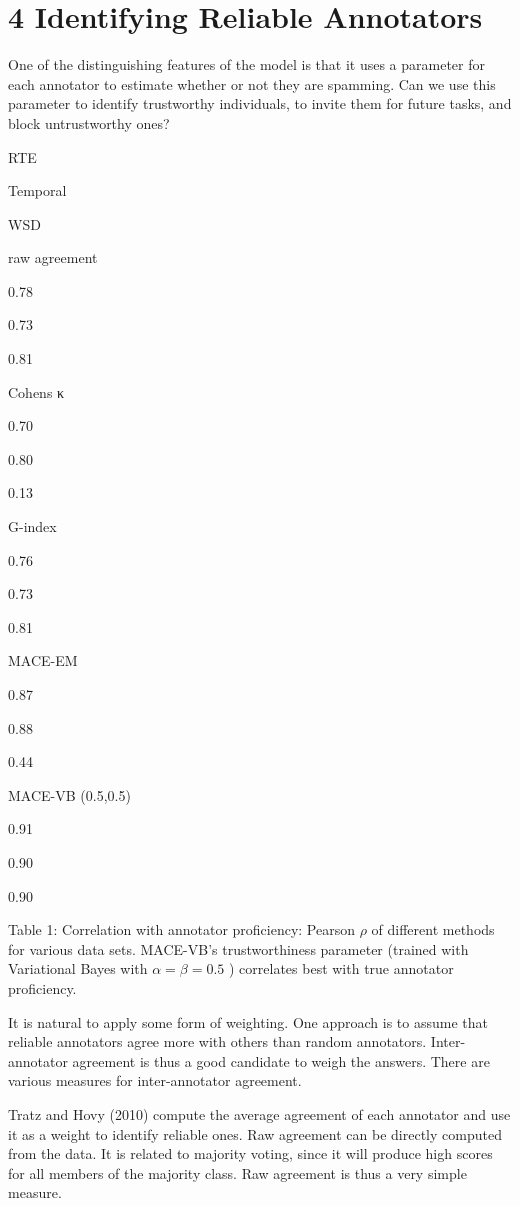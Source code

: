 \documentclass[
]{article}
\begin{document}
\section{4 Identifying Reliable
Annotators}\label{identifying-reliable-annotators}

One of the distinguishing features of the model is that it uses a
parameter for each annotator to estimate whether or not they are
spamming. Can we use this parameter to identify trustworthy individuals,
to invite them for future tasks, and block untrustworthy ones?

RTE

Temporal

WSD

raw agreement

0.78

0.73

0.81

Cohen\textquotesingle s κ

0.70

0.80

0.13

G-index

0.76

0.73

0.81

MACE-EM

0.87

0.88

0.44

MACE-VB (0.5,0.5)

0.91

0.90

0.90

Table 1: Correlation with annotator proficiency: Pearson \(\rho\) of
different methods for various data sets. MACE-VB's trustworthiness
parameter (trained with Variational Bayes with \(\alpha = \beta = 0.5\)
) correlates best with true annotator proficiency.

It is natural to apply some form of weighting. One approach is to assume
that reliable annotators agree more with others than random annotators.
Inter-annotator agreement is thus a good candidate to weigh the answers.
There are various measures for inter-annotator agreement.

Tratz and Hovy (2010) compute the average agreement of each annotator
and use it as a weight to identify reliable ones. Raw agreement can be
directly computed from the data. It is related to majority voting, since
it will produce high scores for all members of the majority class. Raw
agreement is thus a very simple measure.
\end{document}
